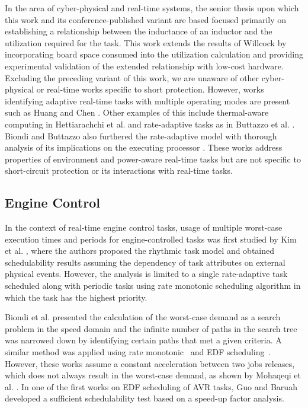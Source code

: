 In the area of cyber-physical and real-time systems, the senior thesis \cite{willcock_short_2016} upon which this work and its conference-published variant \cite{willcock_trading_2017-1} are based focused primarily on establishing a relationship between the inductance of an inductor and the utilization required for the task.
This work extends the results of Willcock \cite{willcock_short_2016} by incorporating board space consumed into the utilization calculation and providing experimental validation of the extended relationship with low-cost hardware.
Excluding the preceding variant of this work, we are unaware of other cyber-physical or real-time works specific to short protection.
However, works identifying adaptive real-time tasks with multiple operating modes are present such as Huang and Chen \cite{huang_techniques_2015}.
Other examples of this include thermal-aware computing in Hettiarachchi et al. \cite{hettiarachchi_design_2014} and rate-adaptive tasks as in Buttazzo et al. \cite{buttazzo_rate-adaptive_2014}.
Biondi and Buttazzo also furthered the rate-adaptive model with thorough analysis of its implications on the executing processor \cite{biondi_engine_2015}.
These works address properties of environment and power-aware real-time tasks but are not specific to short-circuit protection or its interactions with real-time tasks.

\subsection{Engine Control} \label{subsec:engCtrl-relatedWork}

In the context of real-time engine control tasks, usage of multiple worst-case execution times and periods for engine-controlled tasks was first studied by Kim et al. \cite{kim_rhythmic_2012}, where the authors proposed the rhythmic task model and obtained schedulability results assuming the dependency of task attributes on external physical events.
However, the analysis is limited to a single rate-adaptive task scheduled along with periodic tasks using rate monotonic scheduling algorithm in which the task has the highest priority.

Biondi et al. \cite{biondi_exact_2014} presented the calculation of the worst-case demand as a search problem in the speed domain and the infinite number of paths in the search tree was narrowed down by identifying certain paths that met a given criteria.
A similar method was applied using rate monotonic~\cite{biondi_response-time_2015} and EDF scheduling~\cite{biondi_feasibility_2015}.
However, these works assume a constant acceleration between two jobs releases, which does not always result in the worst-case demand, as shown by Mohaqeqi et al. \cite{mohaqeqi_refinement_2017}.
In one of the first works on EDF scheduling of AVR tasks, Guo and Baruah~\cite{guo_uniprocessor_2015} developed a sufficient schedulability test based on a speed-up factor analysis.

